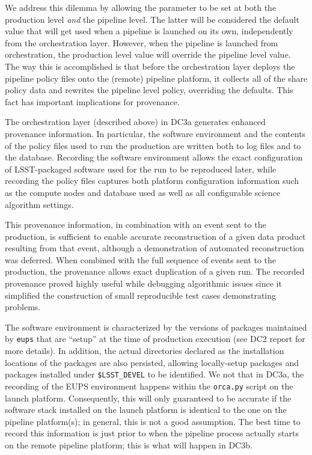 We address this dilemma by allowing the parameter to be set at both
the production level {\it and} the pipeline level.  The latter will be
considered the default value that will get used when a pipeline is
launched on its own, independently from the orchestration layer.
However, when the pipeline is launched from orchestration, the
production level value will override the pipeline level value.  The
way this is accomplished is that before the orchestration layer
deploys the pipeline policy files onto the (remote) pipeline platform,
it collects all of the share policy data and rewrites the pipeline
level policy, overriding the defaults.  This fact has important
implications for provenance.  


  \label{sec:provenance}

The orchestration layer (described above) in DC3a generates enhanced
provenance information.  In particular, the software environment and
the contents of the policy files used to run the production are
written both to log files and to the database.  Recording the software
environment allows the exact configuration of LSST-packaged software
used for the run to be reproduced later, while recording the policy
files captures both platform configuration information such as the
compute nodes and database used as well as all configurable science
algorithm settings.

This provenance information, in combination with an event sent to the
production, is sufficient to enable accurate reconstruction of a given
data product resulting from that event, although a demonstration of
automated reconstruction was deferred.  When combined with the full
sequence of events sent to the production, the provenance allows exact
duplication of a given run.  The recorded provenance proved highly
useful while debugging algorithmic issues since it simplified the
construction of small reproducible test cases demonstrating problems.

The software environment is characterized by the versions of packages
maintained by {\tt eups} that are ``setup'' at the time of production
execution (see DC2 report for more details).  In addition, the actual
directories declared as the installation locations of the packages are
also persisted, allowing locally-setup packages and packages installed
under {\tt \$LSST\_DEVEL} to be identified.  We not that in DC3a, the
recording of the EUPS environment happens within the {\tt orca.py}
script on the launch platform.  Consequently, this will only
guaranteed to be accurate if the software stack installed on the
launch platform is identical to the one on the pipeline platform(s);
in general, this is not a good assumption.  The best time to record
this information is just prior to when the pipeline process actually
starts on the remote pipeline platform; this is what will happen in
DC3b.  

